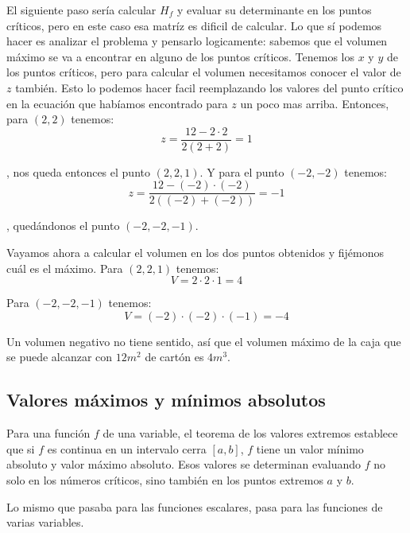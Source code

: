 \documentclass[12pt]{article}
\begin{document}
El siguiente paso sería calcular $ H_{f} $ y evaluar su determinante en los puntos críticos, pero en este caso esa matríz es dificil de calcular. Lo que sí podemos hacer es analizar el problema y pensarlo logicamente: sabemos que el volumen máximo se va a encontrar en alguno de los puntos críticos. Tenemos los $ x $ y $ y $ de los puntos críticos, pero para calcular el volumen necesitamos conocer el valor de $ z $ también. Esto lo podemos hacer facil reemplazando los valores del punto crítico en la ecuación que habíamos encontrado para $ z $ un poco mas arriba. Entonces, para $ (2,2) $ tenemos:
\[
  z = \frac{12-2 \cdot  2}{2(2+2)} = 1
\]

, nos queda entonces el punto $ (2,2,1) $. Y para el punto $ (-2,-2) $ tenemos:
\[
  z = \frac{12-(-2)\cdot (-2)}{2((-2)+(-2))} = -1
\]

, quedándonos el punto $ (-2,-2,-1) $. 

Vayamos ahora a calcular el volumen en los dos puntos obtenidos y fijémonos cuál es el máximo.
Para $ (2,2,1) $ tenemos:
\[
  V = 2\cdot 2\cdot 1 = 4
\]

Para $ (-2,-2,-1) $ tenemos:
\[
  V = (-2)\cdot (-2) \cdot (-1) = -4
\]

Un volumen negativo no tiene sentido, así que el volumen máximo de la caja que se puede alcanzar con $ 12m^2 $ de cartón es $ 4m^3 $.

\subsection{Valores máximos y mínimos absolutos}
Para una función $ f $ de una variable, el teorema de los valores extremos establece que si $ f $ es continua en un intervalo cerra $ \left[a,b\right] $, $ f $ tiene un valor mínimo absoluto y valor máximo absoluto. Esos valores se determinan evaluando $ f $ no solo en los números críticos, sino también en los puntos extremos $ a $ y $ b $. 

Lo mismo que pasaba para las funciones escalares, pasa para las funciones de varias variables.

\vspace{0.2cm}
\vspace{0.2cm}
\end{document}
